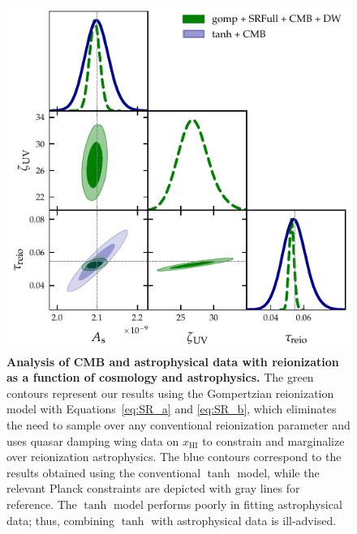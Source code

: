 \documentclass[12pt]{article}
\newcommand{\HI}{\mathrm{HI}}
\begin{document}
\begin{figure}
\centering
\includegraphics[width=0.6\linewidth]{figs/FIG3.pdf}
\caption{\textbf{Analysis of CMB and astrophysical data with
reionization as a function of cosmology and astrophysics.}
The green contours represent our results using the Gompertzian reionization
model with Equations~\eqref{eq:SR_a} and \eqref{eq:SR_b}, which eliminates the need to sample
over any conventional reionization parameter and uses quasar damping
wing data on $x_\HI$ to constrain and marginalize over reionization
astrophysics.
The blue contours correspond to the results obtained using the
conventional $\tanh$ model, while the relevant Planck constraints
\cite{Planck2020a} are depicted with gray lines for reference.
The $\tanh$ model performs poorly in fitting astrophysical data; thus,
combining $\tanh$ with astrophysical data is ill-advised.}
\label{fig:kill}
\end{figure}
\end{document}
